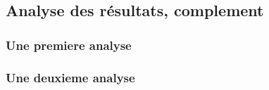 \subsection{Analyse des résultats, complement}

\subsubsection{Une premiere analyse}

\subsubsection{Une deuxieme analyse}

